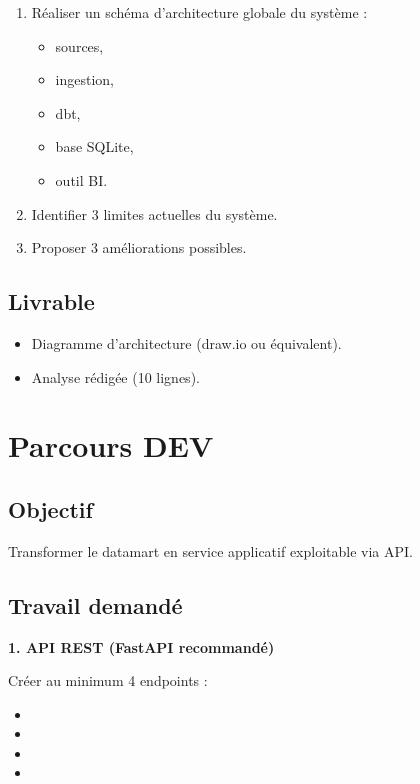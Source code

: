 \documentclass[11pt,a4paper]{article}
\begin{document}
\begin{enumerate}
  \item Réaliser un schéma d’architecture globale du système :
  \begin{itemize}
    \item sources,
    \item ingestion,
    \item dbt,
    \item base SQLite,
    \item outil BI.
  \end{itemize}
  \item Identifier 3 limites actuelles du système.
  \item Proposer 3 améliorations possibles.
\end{enumerate}

\subsection*{Livrable}

\begin{itemize}
  \item Diagramme d’architecture (draw.io ou équivalent).
  \item Analyse rédigée (10 lignes).
\end{itemize}

\section*{Parcours DEV}

\subsection*{Objectif}

Transformer le datamart en service applicatif exploitable via API.

\subsection*{Travail demandé}

\textbf{1. API REST (FastAPI recommandé)}

Créer au minimum 4 endpoints :

\begin{itemize}
  \item {}
  \item {}
  \item {}
  \item {}
\end{itemize}
\end{document}
